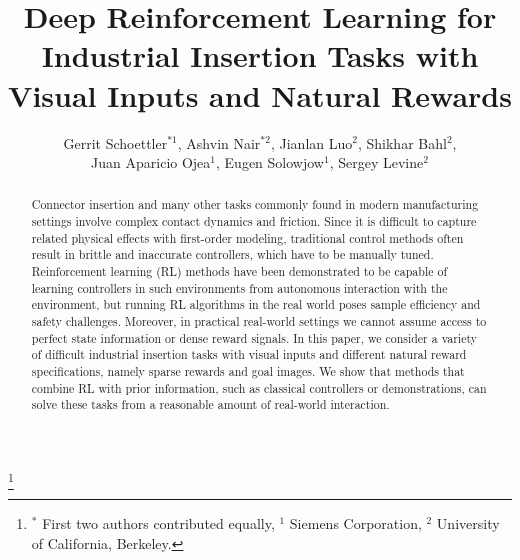 \documentclass{article}
\title{Deep Reinforcement Learning for Industrial Insertion Tasks with Visual Inputs and Natural Rewards
}
\author{Gerrit Schoettler$^{*1}$, Ashvin Nair$^{*2}$, Jianlan Luo$^{2}$, Shikhar Bahl$^{2}$,\\ Juan Aparicio Ojea$^{1}$, Eugen Solowjow$^{1}$, Sergey Levine$^2$}
\newcommand\blfootnote[1]{%
  \begingroup
  \renewcommand\thefootnote{}\footnote{#1}%
  \addtocounter{footnote}{-1}%
  \endgroup
}
\begin{document}




\vspace{-10pt}
\maketitle
\blfootnote{$^*$ First two authors contributed equally, $^1$ Siemens Corporation, $^2$ University of California, Berkeley.}
\begin{abstract}
Connector insertion and many other tasks commonly found in modern manufacturing settings involve complex contact dynamics and friction.
Since it is difficult to capture related physical effects with first-order modeling, traditional control methods often result in brittle and inaccurate controllers, which have to be manually tuned.
Reinforcement learning (RL) methods have been demonstrated to be capable of learning controllers in such environments from autonomous interaction with the environment, but running RL algorithms in the real world poses sample efficiency and safety challenges.
Moreover, in practical real-world settings we cannot assume access to perfect state information or dense reward signals.
In this paper, we consider a variety of difficult industrial insertion tasks with visual inputs and different natural reward specifications, namely sparse rewards and goal images.
We show that methods that combine RL with prior information, such as classical controllers or demonstrations, can solve these tasks from a reasonable amount of real-world interaction.

\end{abstract}










{ \small
% 


}
\end{document}
